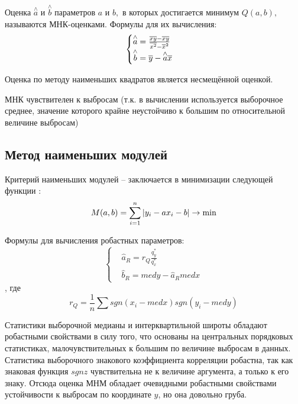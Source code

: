 \documentclass[a4]{article}
\begin{document}
Оценка $\overset{\wedge}{a}$ и $\overset{\wedge}{b}$ параметров $a$ и $b,$ в которых достигается минимум $Q(a,b),$ называются МНК-оценками. Формулы для их вычисления:
\begin{equation}
    \begin{cases}
    \overset{\wedge}{a} = \frac{\overline{x y}-\overline{x}\overline{y}}{\overline{x^2}-\overline{x}^2}\\
    \overset{\wedge}{b} = \overline{y}-\overset{\wedge}{a}\overline{x}
    \end{cases}\hfill
\end{equation}

Оценка по методу наименьших квадратов является несмещённой оценкой.

МНК чувствителен к выбросам (т.к. в вычислении используется выборочное среднее, значение которого крайне неустойчиво к большим по относительной величине выбросам)

\subsection{Метод наименьших модулей}
Критерий наименьших модулей – заключается в минимизации следующей функции \cite{6_4}:
\begin{equation}
    M(a,b) = \sum\limits_{i=1}^n\vert y_i-ax_i-b\vert\to\min\hfill
\end{equation}

Формулы для вычисления робастных параметров:
\begin{equation}
\begin{cases}
&  \hat{a}_{R} = r_{Q}\frac{q_{y}^{*}}{q_{x}^{*}} \\ 
&  \hat{b}_{R}= medy - \hat{a}_{R}medx
\end{cases}
\end{equation}, где 
\begin{equation}
	r_{Q} = \frac{1}{n}\sum sgn(x_{i} - medx)sgn(y_{i} - medy)
\end{equation}

Статистики выборочной медианы и интерквартильной широты обладают
робастными свойствами в силу того, что основаны на центральных порядковых статистиках, малочувствительных к большим по величине выбросам
в данных. Статистика выборочного знакового коэффициента корреляции
робастна, так как знаковая функция $ sgn z $ чувствительна не к величине
аргумента, а только к его знаку. Отсюда оценка МНМ обладает очевидными робастными свойствами устойчивости к выбросам по
координате $ y $, но она довольно груба.
\end{document}
